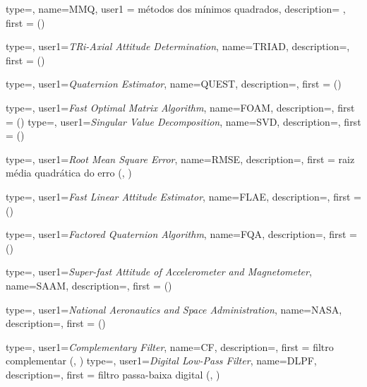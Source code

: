 {type=\acronymtype,
  name={MMQ},
  user1 = {métodos dos mínimos quadrados},
  description= {},
  first = { ()}
}

{type=\acronymtype,
  user1={\emph{TRi-Axial Attitude Determination}},
  name={TRIAD},
  description={},
  first = { ()}
}

{type=\acronymtype,
  user1={\emph{Quaternion Estimator}},
  name={QUEST},
  description={},
  first = { ()}
}

{type=\acronymtype,
  user1={\emph{Fast Optimal Matrix Algorithm}},
  name={FOAM},
  description={},
  first = { ()}
}
{type=\acronymtype,
  user1={\emph{Singular Value Decomposition}},
  name={SVD},
  description={},
  first = { ()}
}


{type=\acronymtype,
  user1={\emph{Root Mean Square Error}},
  name={RMSE},
  description={},
  first = {raiz média quadrática do erro (, )}
}

{type=\acronymtype,
  user1={\emph{Fast Linear Attitude Estimator}},
  name={FLAE},
  description={},
  first = { ()}
}

{type=\acronymtype,
  user1={\emph{Factored Quaternion Algorithm}},
  name={FQA},
  description={},
  first = { ()}
}


{type=\acronymtype,
  user1={\emph{Super-fast Attitude of Accelerometer and Magnetometer}},
  name={SAAM},
  description={},
  first = { ()}
}



{type=\acronymtype,
  user1={\emph{National Aeronautics and Space Administration}},
  name={NASA},
  description={},
  first = { ()}
}

{type=\acronymtype,
  user1={\emph{Complementary Filter}},
  name={CF},
  description={},
  first = {filtro complementar (, )}
}
{type=\acronymtype,
  user1=\emph{Digital Low-Pass Filter},
  name={DLPF},
  description={},
  first = {filtro passa-baixa digital (, )}
}

